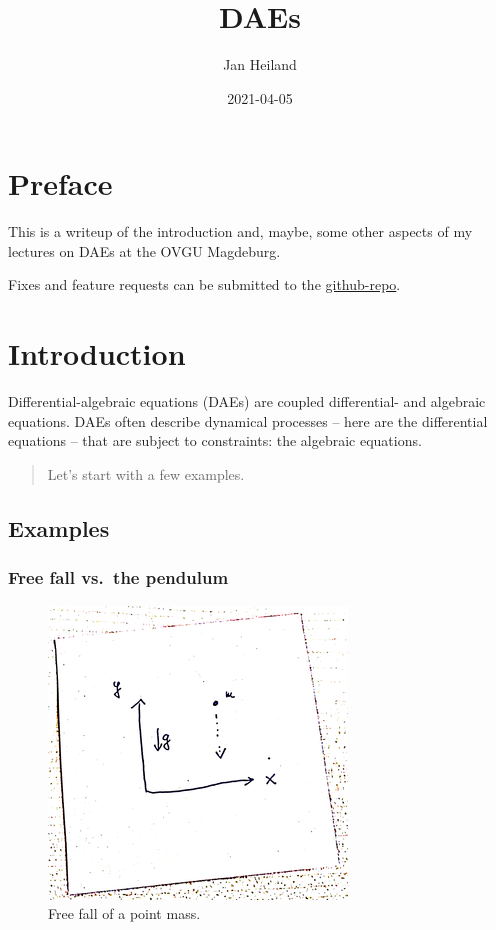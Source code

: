 \documentclass[]{book}
\title{DAEs}
\author{Jan Heiland}
\institute{OVGU/MPI}
\date{2021-04-05}
\newenvironment {JHSAYS} [0] {\begin{quote}} {\end{quote}}
\theoremstyle{definition}
\theoremstyle{definition}
\theoremstyle{definition}
\theoremstyle{remark}
\begin{document}
\maketitle

{
\setcounter{tocdepth}{1}
\tableofcontents
}
\hypertarget{preface}{%
\chapter*{Preface}\label{preface}}

This is a writeup of the introduction and, maybe, some other aspects of my lectures on DAEs at the OVGU Magdeburg.

Fixes and feature requests can be submitted to the \href{https://github.com/highlando/script-daes}{github-repo}.

\newcommand{\ind}{\operatorname{ind}}

\hypertarget{introduction}{%
\chapter{Introduction}\label{introduction}}

Differential-algebraic equations (DAEs) are coupled differential- and algebraic equations. DAEs often describe dynamical processes -- here are the differential equations -- that are subject to constraints: the algebraic equations.

\begin{JHSAYS}
Let's start with a few examples.
\end{JHSAYS}

\hypertarget{examples}{%
\section{Examples}\label{examples}}

\hypertarget{free-fall-vs.-the-pendulum}{%
\subsection*{Free fall vs.~the pendulum}\label{free-fall-vs.-the-pendulum}}

\begin{figure}

{\centering \includegraphics[width=0.4\linewidth]{pics/freefall} 

}

\caption{Free fall of a point mass.}\label{fig:free-fall}
\end{figure}
\end{document}

